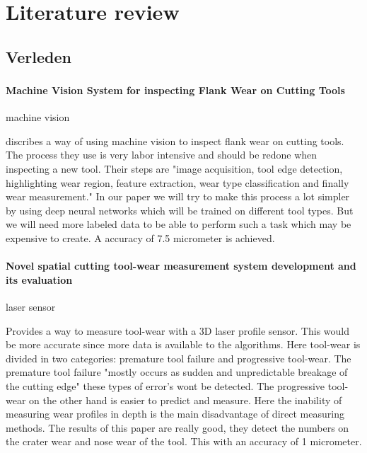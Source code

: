 
\chapter{Literature review}

\section{Verleden}
    \subsection{}
        \subsubsection{Machine Vision System for inspecting Flank Wear on Cutting Tools}
            machine vision
            
            \cite{Schmitt2012} discribes a way of using machine vision to inspect flank wear on cutting tools. The process they use is very labor intensive and should be redone when inspecting a new tool. Their steps are "image acquisition, tool edge detection, highlighting wear region, feature extraction, wear type classification and finally wear measurement." In our paper we will try to make this process a lot simpler by using deep neural networks which will be trained on different tool types. But we will need more labeled data to be able to perform such a task which may be expensive to create. A accuracy of 7.5 micrometer is achieved.
            
        \subsubsection{Novel spatial cutting tool-wear measurement system development and its evaluation}
            laser sensor
            
            \cite{Cerce2015} Provides a way to measure tool-wear with a 3D laser profile sensor. This would be more accurate since more data is available to the algorithms. Here tool-wear is divided in two categories: premature tool failure and progressive tool-wear. The premature tool failure "mostly occurs as sudden and unpredictable breakage of the cutting edge" these types of error's wont be detected. The progressive tool-wear on the other hand is easier to predict and measure. Here the inability of measuring wear profiles in depth is the main disadvantage of direct measuring methods. The results of this paper are really good, they detect the numbers on the crater wear and nose wear of the tool. This with an accuracy of 1 micrometer. 
            
